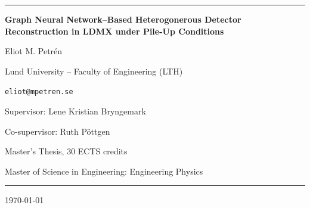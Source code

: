 





\begin{titlepage}
\begin{center}
  \noindent\rule{\textwidth}{4pt}
  \vspace{0.20in}

  {\LARGE \bfseries Graph Neural Network--Based Heterogonerous Detector Reconstruction in LDMX under Pile-Up Conditions\par}
  \vspace{0.7em}

  {\large Eliot M. Petrén\par}
  \vspace{0.35em}
  {\normalsize Lund University -- Faculty of Engineering (LTH)\par}
  \vspace{0.2em}
  {\normalsize \texttt{eliot@mpetren.se}\par}
  \vspace{0.45em}
  {\normalsize Supervisor: Lene Kristian Bryngemark\par}
  {\normalsize Co-supervisor: Ruth Pöttgen\par}

  \vspace{0.7em}
  {\normalsize Master's Thesis, 30 ECTS credits\par}
  {\normalsize Master of Science in Engineering: Engineering Physics\par}

  \vspace{0.18in}
  \noindent\rule{\textwidth}{1pt}
\end{center}

\vspace{0.35in}

\begin{abstract}

\end{abstract}

\vfill

\begin{center}
  \today
\end{center}
\end{titlepage}

\clearpage

